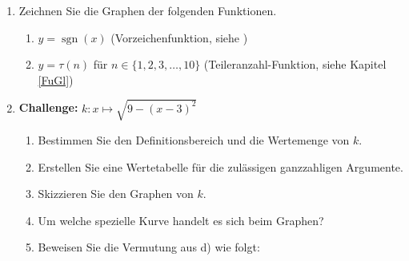 \begin{ueb}
\begin{enumerate}
\begin{center}
              \end{center}
              ```
        \item Zeichnen Sie die Graphen der folgenden Funktionen.

              \begin{enumerate}
                  \item \(y=\operatorname{sgn}(x)\)
                        (Vorzeichenfunktion, siehe )

                  \item \(y=\tau(n)\) für
                        \(n\in\{1,2,3,\ldots,10\}\)
                        (Teileranzahl-Funktion, siehe Kapitel \ref{FuGl})
              \end{enumerate}

        \item \textbf{Challenge:}
              \(k\colon x\mapsto\sqrt{9-(x-3)^2}\)

              \begin{enumerate}
                  \item Bestimmen Sie den Definitionsbereich und die Wertemenge
                        von \(k\).

                  \item Erstellen Sie eine Wertetabelle für die zulässigen
                        ganzzahligen Argumente.

                  \item Skizzieren Sie den Graphen von \(k\).

                  \item Um welche spezielle Kurve handelt es sich beim Graphen?

                  \item Beweisen Sie die Vermutung aus d) wie folgt:


\end{enumerate}
\end{enumerate}
\end{ueb}
